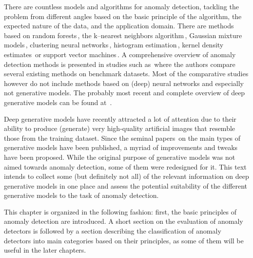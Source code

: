 There are countless models and algorithms for anomaly detection, tackling the problem from different angles based on the basic principle of the algorithm, the expected nature of the data, and the application domain. There are methods based on random forests\,\cite{liu2008isolation}, the k--nearest neighbors algorithm\,\cite{harmeling2006outliers}, Gaussian mixture models\,\cite{mahadevan2010anomaly}, clustering neural networks\,\cite{schlegl2017unsupervised}, histogram estimation\,\cite{pevny2016loda}, kernel density estimates\,\cite{latecki2007outlier} or support vector machines\,\cite{scholkopf2001estimating}. A comprehensive overview of anomaly detection methods is presented in studies such as\,\cite{pimentel2014review,goldstein2016comparative,lazarevic2003comparative,chandola2009anomaly,campos2016evaluation} where the authors compare several existing methods on benchmark datasets. Most of the comparative studies however do not include methods based
on (deep) neural networks and especially not generative models. The probably most recent and complete overview of deep generative models can be found at~\cite{ruff2020unifying}.

Deep generative models have recently attracted a lot of attention due to their ability to produce (generate) very high-quality artificial images that resemble those from the training dataset. Since the seminal papers\,\cite{goodfellow2014gan,kingma2013vae,dinh2014nice} on the main types of generative models have been published, a myriad of improvements and tweaks have been proposed. While the original purpose of generative models was not aimed towards anomaly detection, some of them were redesigned for it. This text intends to collect some (but definitely not all) of the relevant information on deep generative models in one place and assess the potential suitability of the different generative models to the task of anomaly detection.

This chapter is organized in the following fashion: first, the basic principles of anomaly detection are introduced. A short section on the evaluation of anomaly detectors is followed by a section describing the classification of anomaly detectors into main categories based on their principles, as some of them will be useful in the later chapters.

